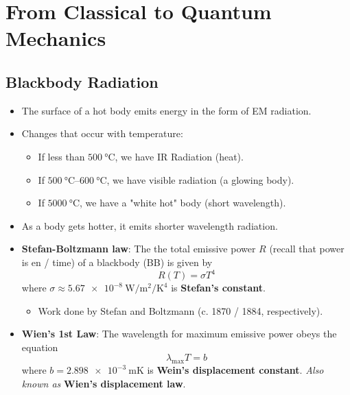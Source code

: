 \documentclass[../notes.tex]{subfiles}
\begin{document}
\chapter{From Classical to Quantum Mechanics}
\section{Blackbody Radiation}
\begin{itemize}
    \item {}The surface of a hot body emits energy in the form of EM radiation.
    \item Changes that occur with temperature:
    \begin{itemize}
        \item If less than $\SI{500}{\celsius}$, we have IR Radiation (heat).
        \item If $\SIrange{500}{600}{\celsius}$, we have visible radiation (a glowing body).
        \item If $\SI{5000}{\celsius}$, we have a "white hot" body (short wavelength).
    \end{itemize}
    \item As a body gets hotter, it emits shorter wavelength radiation.
    \item \textbf{Stefan-Boltzmann law}: The the total emissive power $R$ (recall that power is en / time) of a blackbody (BB) is given by
    \begin{equation*}
        R(T) = \sigma T^4
    \end{equation*}
    where $\sigma\approx\SI{5.67e-8}{\watt\per\square\meter\per\kelvin\tothe{4}}$ is \textbf{Stefan's constant}.
    \begin{itemize}
        \item Work done by Stefan and Boltzmann (c. 1870 / 1884, respectively).
    \end{itemize}
    \item \textbf{Wien's 1st Law}: The wavelength for maximum emissive power obeys the equation
    \begin{equation*}
        \lambda_\text{max}T = b
    \end{equation*}
    where $b=\SI{2.898e-3}{\meter\kelvin}$ is \textbf{Wein's displacement constant}. \emph{Also known as} \textbf{Wien's displacement law}.
    \begin{figure}[h!]
        \centering
\end{figure}
\end{itemize}
\end{document}
